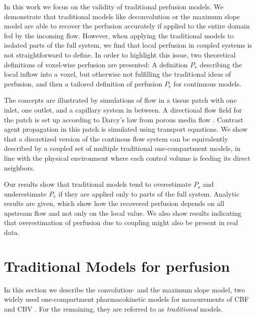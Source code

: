 \documentclass[journal,twocolumn]{IEEEtran}
\newcommand{\Perfv}{P_{\mathrm{v}}}
\newcommand{\Perfs}{P_{\mathrm{s}}}
\begin{document}

	In this work we focus on the validity of traditional perfusion models.
	We  demonstrate that traditional models like deconvolution or the maximum slope model are able to recover the perfusion accurately if applied to the entire domain fed by the incoming flow.
	However, when applying the traditional models to isolated parts of the full system, we find that local perfusion in coupled systems is not straightforward to define.
	In order to highlight this issue, two theoretical definitions of voxel-wise perfusion are presented: A definition $\Perfv$ describing the local inflow into a voxel, but otherwise not fulfilling the traditional ideas of perfusion, and then a tailored definition of perfusion $\Perfs$ for continuous models.

The concepts are illustrated by simulations of flow in a tissue patch with one inlet, one outlet, and a capillary system in between.
	A directional flow field for the patch is set up according to Darcy's law from porous media flow \cite{Darcy56}.
	Contrast agent propagation in this patch is simulated using transport equations.
	We show that a discretized version of the continous flow system can be equivalently described by a coupled set of multiple traditional one-compartment models, in line with the physical environment where each control volume is feeding its direct neighbors.

	
	Our results show that traditional models tend to overestimate $\Perfs$ and underestimate $\Perfv$ if they are applied only to parts of the full system.
	Analytic results are given, which show how the recovered perfusion depends on all upstream flow and not only on the local value.
	We also show results indicating that overestimation of perfusion due to coupling might also be present in real data.

	

	\section{Traditional Models for perfusion} \label{sec:traditional}

	In this section we describe the convolution- and the maximum slope model, two widely used one-compartment pharmacokinetic models for measurements of CBF and CBV \cite{Feng2013,Chen2011,kudo10}.
	For the remaining, they are referred to as \emph{traditional} models.
\end{document}
